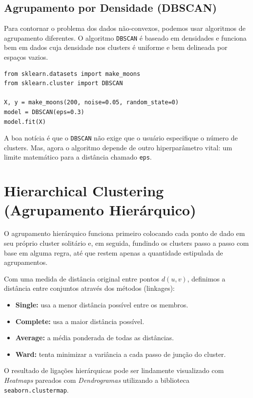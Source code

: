 \documentclass[11pt,a4paper]{article}
\begin{document}
\subsection{Agrupamento por Densidade (DBSCAN)}
Para contornar o problema dos dados não-convexos, podemos usar algoritmos de agrupamento diferentes. O algoritmo \texttt{DBSCAN} é baseado em densidades e funciona bem em dados cuja densidade nos clusters é uniforme e bem delineada por espaços vazios.

\begin{lstlisting}
from sklearn.datasets import make_moons
from sklearn.cluster import DBSCAN

X, y = make_moons(200, noise=0.05, random_state=0)
model = DBSCAN(eps=0.3)
model.fit(X)
\end{lstlisting}

A boa notícia é que o \texttt{DBSCAN} não exige que o usuário especifique o número de clusters. Mas, agora o algoritmo depende de outro hiperparâmetro vital: um limite matemático para a distância chamado \texttt{eps}.

\section{Hierarchical Clustering (Agrupamento Hierárquico)}

O agrupamento hierárquico funciona primeiro colocando cada ponto de dado em seu próprio cluster solitário e, em seguida, fundindo os clusters passo a passo com base em alguma regra, até que restem apenas a quantidade estipulada de agrupamentos.

Com uma medida de distância original entre pontos $d(u,v)$, definimos a distância entre conjuntos através dos métodos (linkages):
\begin{itemize}
    \item \textbf{Single:} usa a menor distância possível entre os membros.
    \item \textbf{Complete:} usa a maior distância possível.
    \item \textbf{Average:} a média ponderada de todas as distâncias.
    \item \textbf{Ward:} tenta minimizar a variância a cada passo de junção do cluster.
\end{itemize}

O resultado de ligações hierárquicas pode ser lindamente visualizado com \emph{Heatmaps} pareados com \emph{Dendrogramas} utilizando a biblioteca \texttt{seaborn.clustermap}.
\end{document}
